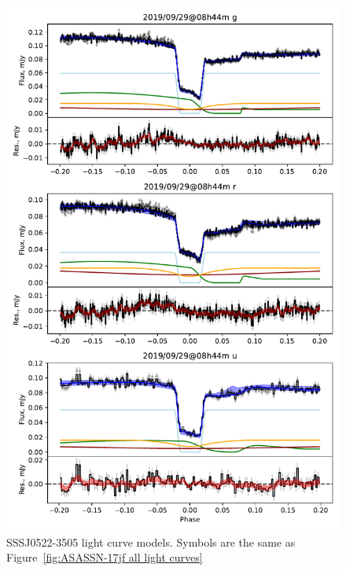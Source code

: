\begin{figure}
    \centering
    \includegraphics[width=\textwidth]{figures/results/three_cvs_with_weird_colours/SSS111126/SSS111126_1.pdf}
    \caption{SSSJ0522-3505 light curve models. Symbols are the same as Figure~\ref{fig:ASASSN-17jf all light curves}}
    \label{fig:SSSJ0522-3505 all light curves}
\end{figure}
